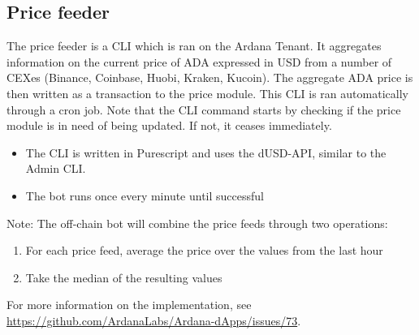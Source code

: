 \documentclass{article} %
\begin{document}
\subsection{Price feeder}

The price feeder is a CLI which is ran on the Ardana Tenant. It aggregates
information on the current price of ADA expressed in USD from a number of CEXes
(Binance, Coinbase, Huobi, Kraken, Kucoin). The aggregate ADA price is then
written as a transaction to the price module. This CLI is ran automatically
through a cron job. Note that the CLI command starts by checking if the price
module is in need of being updated. If not, it ceases immediately.

\begin{itemize}
  \item The CLI is written in Purescript and uses the dUSD-API, similar to the
    Admin CLI.
  \item The bot runs once every minute until successful
\end{itemize}

Note: The off-chain bot will combine the price feeds through two operations:
\begin{enumerate}
  \item For each price feed, average the price over the values from the last
    hour
  \item Take the median of the resulting values
\end{enumerate}

For more information on the implementation, see
\url{https://github.com/ArdanaLabs/Ardana-dApps/issues/73}.
\end{document}
